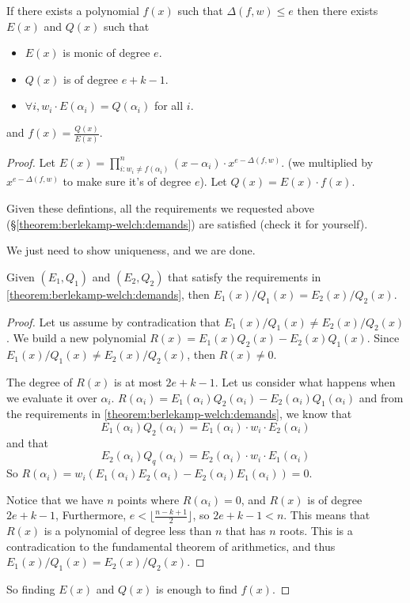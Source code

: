 \begin{theorem}
 If there exists a polynomial $f(x)$ such that $\Delta(f,w)\le e$
 then there exists $E(x)$ and $Q(x)$ such that 

 \begin{itemize}
    \item $E(x)$ is monic of degree $e$.
    \item $Q(x)$ is of degree $e+k-1$.
    \item $\forall i, w_i\cdot E(\alpha_i)=Q(\alpha_i)$ for all $i$.
 \end{itemize}\label{theorem:berlekamp-welch:demands}

 and $f(x)=\frac{Q(x)}{E(x)}$.
\end{theorem}

\begin{proof}
    Let $E(x)=\prod_{i:w_i\ne f(\alpha_i)}^{n} (x-\alpha_i)\cdot x^{e-\Delta(f,w)}$.
    (we multiplied by $x^{e-\Delta(f,w)}$ to make sure it's of degree $e$).
    Let $Q(x)=E(x)\cdot f(x)$.
    
    Given these defintions, all the requirements we requested above 
    (\S\ref{theorem:berlekamp-welch:demands}) are satisfied (check it for yourself).

    We just need to show uniqueness, and we are done.
    \begin{lemma}
        Given $(E_1, Q_1)$ and $(E_2, Q_2)$ that satisfy the requirements in \ref{theorem:berlekamp-welch:demands},
        then $E_1(x)/Q_1(x) = E_2(x)/Q_2(x)$.
    \end{lemma}

    \begin{proof}
        Let us assume by contradication that $E_1(x)/Q_1(x) \ne E_2(x)/Q_2(x)$.
        We build a new polynomial  $R(x)=E_1(x)Q_2(x) - E_2(x)Q_1(x)$.
        Since $E_1(x)/Q_1(x) \ne E_2(x)/Q_2(x)$, then $R(x)\ne 0$.

        The degree of $R(x)$ is at most $2e+k-1$. Let us consider what happens when we 
        evaluate it over $\alpha_i$.
        $R(\alpha_i)= E_1(\alpha_i)Q_2(\alpha_i) - E_2(\alpha_i)Q_1(\alpha_i)$
        and from the requirements in \ref{theorem:berlekamp-welch:demands}, we know that
        $$E_1(\alpha_i)Q_2(\alpha_i) = E_1(\alpha_i)\cdot w_i\cdot E_2(\alpha_i)$$
        and that 
        $$E_2(\alpha_i)Q_q(\alpha_i) = E_2(\alpha_i)\cdot w_i\cdot E_1(\alpha_i)$$
        So $R(\alpha_i)= w_i(E_1(\alpha_i)E_2(\alpha_i) - E_2(\alpha_i)E_1(\alpha_i))=0$.

        Notice that we have $n$ points where $R(\alpha_i)=0$, and $R(x)$ is of degree $2e+k-1$,
        Furthermore, $e<\lfloor \frac{n-k+1}{2}\rfloor$, so $2e+k-1<n$.
        This means that $R(x)$ is a polynomial of degree less than $n$ that has $n$ roots.
        This is a contradication to the fundamental theorem of arithmetics,
        and thus $E_1(x)/Q_1(x) = E_2(x)/Q_2(x)$.
    \end{proof}

    So finding $E(x)$ and $Q(x)$ is enough to find $f(x)$.
\end{proof}


